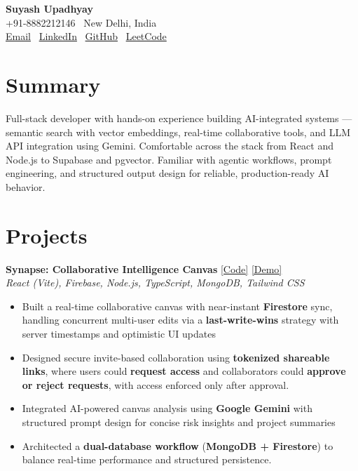 \documentclass[10pt, a4paper]{article}
\begin{document}
\begin{center}
{\Huge \textbf{Suyash Upadhyay}}\\ 
+91-8882212146 \textbar\ New Delhi, India \\
\href{mailto:suyash.upadhyay01@gmail.com}{Email} \textbar\
\href{https://www.linkedin.com/in/suyash-upadhyay-49554b333/}{LinkedIn} \textbar\
\href{https://github.com/kryonic-fluke}{GitHub} \textbar\
\href{https://leetcode.com/u/pssv_aggrsv_coder/}{LeetCode}
\end{center}

\section*{Summary}
Full-stack developer with hands-on experience building AI-integrated systems — semantic search with vector embeddings, real-time collaborative tools, and LLM API integration using Gemini. Comfortable across the stack from React and Node.js to Supabase and pgvector. Familiar with agentic workflows, prompt engineering, and structured output design for reliable, production-ready AI behavior. 
\section*{Projects}

\textbf{Synapse: Collaborative Intelligence Canvas} \hfill \href{https://github.com/kryonic-fluke/Synapse}{[Code]} \href{https://synapse-workspace.netlify.app/}{[Demo]} \\
\textit{React (Vite), Firebase, Node.js, TypeScript, MongoDB, Tailwind CSS}
\begin{itemize}[leftmargin=*, itemsep=2pt, topsep=2pt]
\item Built a real-time collaborative canvas with near-instant \textbf{Firestore} sync, handling concurrent multi-user edits via a \textbf{last-write-wins} strategy with server timestamps and optimistic UI updates
\item Designed secure invite-based collaboration using \textbf{tokenized shareable links}, where users could \textbf{request access} and collaborators could \textbf{approve or reject requests}, with access enforced only after approval.

\item Integrated AI-powered canvas analysis using \textbf{Google Gemini} with structured prompt design for concise risk insights and project summaries
\item Architected a \textbf{dual-database workflow} (\textbf{MongoDB + Firestore}) to balance real-time performance and structured persistence.
\end{itemize}
\end{document}
